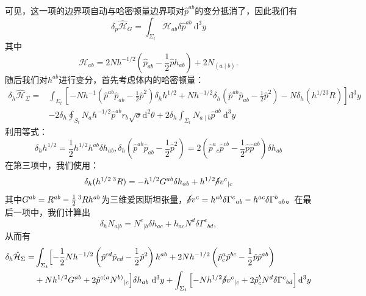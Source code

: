 \documentclass[hyperref, UTF8, a4paper]{ctexart}
\begin{document}
可见，这一项的边界项自动与哈密顿量边界项对$\hat{p}^{ab}$的变分抵消了，因此我们有
\begin{equation*}
	\delta _{p}\hat{\mathcal{H}}_{G} =\int _{\Sigma _{t}}\mathcal{H}_{ab} \delta \hat{p}^{ab} \ \mathrm{d}^{3} y
\end{equation*}
其中
\begin{equation*}
	\boxed{\mathcal{H}_{ab} =2Nh^{-1/2}\left(\hat{p}_{ab} -\frac{1}{2}\hat{p} h_{ab}\right) +2N_{(a\mid b)}} .
\end{equation*}
随后我们对$h^{ab}$进行变分，首先考虑体内的哈密顿量：
\begin{equation*}
	\begin{aligned}
		\delta _{h}\hat{\mathcal{H}}_{\Sigma } = & \int _{\Sigma _{t}}\left[ -Nh^{-1}\left(\hat{p}^{ab}\hat{p}_{ab} -\frac{1}{2}\hat{p}^{2}\right) \delta _{h} h^{1/2} +Nh^{-1/2} \delta _{h}\left(\hat{p}^{ab}\hat{p}_{ab} -\frac{1}{2}\hat{p}^{2}\right) -N\delta _{h}\left( h^{1/23} R\right)\right]\mathrm{d}^{3} y\\
		& -2\delta _{h}\oint _{S_{t}} N_{a} h^{-1/2}\hat{p}^{ab} r_{b}\sqrt{\sigma }\mathrm{d}^{2} \theta +2\delta _{h}\int _{\Sigma _{t}} N_{a\mid b}\hat{p}^{ab} \ \mathrm{d}^{3} y
	\end{aligned}
\end{equation*}
利用等式：
\begin{equation*}
	\delta _{h} h^{1/2} =\frac{1}{2} h^{1/2} h^{ab} \delta h_{ab} ,\delta _{h}\left(\hat{p}^{ab}\hat{p}_{ab} -\frac{1}{2}\hat{p}^{2}\right) =2\left(\hat{p}^{a}{}_{c}\hat{p}^{cb} -\frac{1}{2}\hat{p}\hat{p}^{ab}\right) \delta h_{ab}
\end{equation*}
在第三项中，我们使用：
\begin{equation*}
	\delta _{h} (h^{1/2}\prescript{3}{}{} R)=-h^{1/2} G^{ab} \delta h_{ab} +h^{1/2}\cancel{\delta } v^{c}{}_{|c}
\end{equation*}
其中$G^{ab} =R^{ab} -\frac{1}{2}\prescript{3}{}{} Rh^{ab}$为三维爱因斯坦张量，$\cancel{\delta } v^{c} =h^{ab} \delta \Gamma ^{c}{}_{ab} -h^{ac} \delta \Gamma ^{b}{}_{ab}$。在最后一项中，我们计算出
\begin{equation*}
	\delta _{h} N_{a|b} =N^{c}{}_{|b} \delta h_{ac} +h_{ac} N^{d} \delta \Gamma ^{c}{}_{bd} ,
\end{equation*}
从而有
\begin{equation}
	\begin{aligned}
		\delta _{h}\hat{\mathcal{H}}_{\Sigma } = & \int _{\Sigma _{t}}\Bigl[ -\frac{1}{2} Nh^{-1/2}\left(\hat{p}^{cd}\hat{p}_{cd} -\frac{1}{2}\hat{p}^{2}\right) h^{ab} +2Nh^{-1/2}\left(\hat{p}_{c}^{a}\hat{p}^{bc} -\frac{1}{2}\hat{p}\hat{p}^{ab}\right)\\
		& +Nh^{1/2} G^{ab} +2\hat{p}^{c(a} N^{b)}{}_{|c}\Bigr] \delta h_{ab} \ \mathrm{d}^{3} y+\int _{\Sigma _{t}}\left[ -Nh^{1/2}\cancel{\delta } v^{c}{}_{|c} +2\hat{p}_{c}^{b} N^{d} \delta \Gamma ^{c}{}_{bd}\right]\mathrm{d}^{3} y
	\end{aligned}
	\label{variation of induced metric}
\end{equation}
\end{document}
